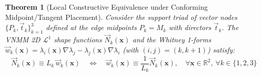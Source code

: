 \documentclass[preprint,12pt]{elsarticle}
\newtheorem{theorem}{Theorem}
\begin{document}
\begin{theorem}[Local Constructive Equivalence under Conforming Midpoint/Tangent Placement]
    \label{thm:dual_equivalence}
    Consider the support triad of vector nodes $\{P_k, \vec{t}_k\}_{k=1}^3$ defined at the edge midpoints $P_k = M_k$ with directors $\vec{t}_k$. The VNMM 2D $\mathcal{L}^1$ shape functions $\vec{N}_k(\mathbf{x})$ and the Whitney 1-forms $\vec{w}_k(\mathbf{x}) = \lambda_i(\mathbf{x})\nabla\lambda_j - \lambda_j(\mathbf{x})\nabla\lambda_i$ (with $(i,j)=(k,k+1)$) satisfy:
    \begin{equation}
        \vec{N}_k(\mathbf{x}) \equiv L_k \, \vec{w}_k(\mathbf{x}) \quad \Longleftrightarrow \quad \vec{w}_k(\mathbf{x}) \equiv \frac{1}{L_k} \vec{N}_k(\mathbf{x}), \quad \forall \mathbf{x} \in \mathbb{R}^2, \ \forall k \in \{1, 2, 3\}
        \label{eq:dual_equivalence_scaling}
    \end{equation}
\end{theorem}
\end{document}
